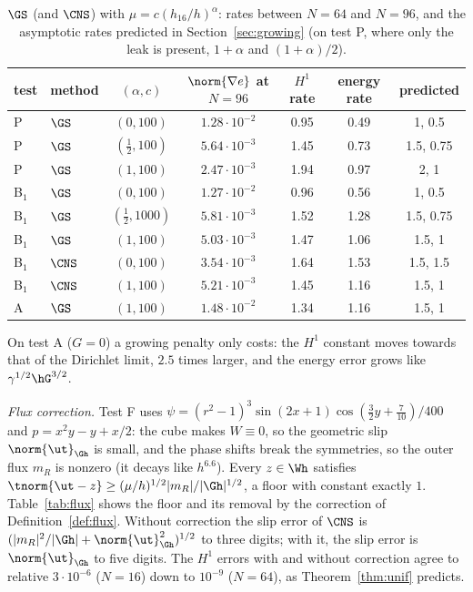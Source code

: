 \begin{table}[t]
\centering\small
\caption{$\GS$ (and $\CNS$) with $\mu=c(h_{16}/h)^\alpha$: rates between $N=64$ and $N=96$, and the asymptotic rates predicted in Section~\ref{sec:growing} (on test P, where only the leak is present, $1+\alpha$ and $(1+\alpha)/2$).}\label{tab:rescue}
\begin{tabular}{llccccc}
\toprule
test & method & $(\alpha,c)$ & $\norm{\nabla e}$ at $N=96$ & $H^1$ rate & energy rate & predicted\\
\midrule
P & $\GS$ & $(0,100)$ & $1.28\cdot10^{-2}$ & 0.95 & 0.49 & 1, 0.5\\
P & $\GS$ & $(\frac12,100)$ & $5.64\cdot10^{-3}$ & 1.45 & 0.73 & 1.5, 0.75\\
P & $\GS$ & $(1,100)$ & $2.47\cdot10^{-3}$ & 1.94 & 0.97 & 2, 1\\
B$_1$ & $\GS$ & $(0,100)$ & $1.27\cdot10^{-2}$ & 0.96 & 0.56 & 1, 0.5\\
B$_1$ & $\GS$ & $(\frac12,1000)$ & $5.81\cdot10^{-3}$ & 1.52 & 1.28 & 1.5, 0.75\\
B$_1$ & $\GS$ & $(1,100)$ & $5.03\cdot10^{-3}$ & 1.47 & 1.06 & 1.5, 1\\
B$_1$ & $\CNS$ & $(0,100)$ & $3.54\cdot10^{-3}$ & 1.64 & 1.53 & 1.5, 1.5\\
B$_1$ & $\CNS$ & $(1,100)$ & $5.21\cdot10^{-3}$ & 1.45 & 1.16 & 1.5, 1\\
A & $\GS$ & $(1,100)$ & $1.48\cdot10^{-2}$ & 1.34 & 1.16 & 1.5, 1\\
\bottomrule
\end{tabular}
\end{table} On test A ($G=0$) a growing penalty only costs: the $H^1$ constant moves towards that of the Dirichlet limit, $2.5$ times larger, and the energy error grows like $\gamma^{1/2}\hG^{3/2}$.

\emph{Flux correction.} Test F uses $\psi=(r^2-1)^3\sin(2x+1)\cos(\frac32y+\frac7{10})/400$ and $p=x^2y-y+x/2$: the cube makes $W\equiv0$, so the geometric slip $\norm{\ut}_{\Gh}$ is small, and the phase shifts break the symmetries, so the outer flux $m_R$ is nonzero (it decays like $h^{6.6}$). Every $z\in\Wh$ satisfies $\tnorm{\ut-z}\ge(\mu/h)^{1/2}|m_R|/|\Gh|^{1/2}$, a floor with constant exactly $1$. Table~\ref{tab:flux} shows the floor and its removal by the correction of Definition~\ref{def:flux}. Without correction the slip error of $\CNS$ is $(|m_R|^2/|\Gh|+\norm{\ut}^2_{\Gh})^{1/2}$ to three digits; with it, the slip error is $\norm{\ut}_{\Gh}$ to five digits. The $H^1$ errors with and without correction agree to relative $3\cdot10^{-6}$ ($N=16$) down to $10^{-9}$ ($N=64$), as Theorem~\ref{thm:unif} predicts.

